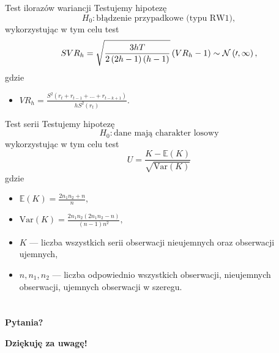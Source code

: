 \documentclass[a4paper, 11pt]{beamer}
\begin{document}
	\begin{frame}{Test ilorazów wariancji}
		Testujemy hipotezę \[
				H_{0}: \mbox{błądzenie przypadkowe (typu RW1)},
		\] wykorzystując w tym celu test \[
			SVR_h = \sqrt{\frac{3hT}{2\left(2h-1\right)\left(h-1\right)}} \left(VR_h - 1\right) \sim \cal{N}\left(0,1\right),
		\] gdzie
		\begin{itemize}
			\item $VR_h = \frac{S^2\left(r_t+r_{t-1}+\ldots+r_{t-k+1}\right)}{hS^2\left(r_t\right)}.$
		\end{itemize}
	\end{frame}
	
	\begin{frame}{Test serii}
		Testujemy hipotezę \[
				H_{0}: \mbox{dane mają charakter losowy}
		\] wykorzystując w tym celu test \[
			U=\frac{K-\mathbb{E}\left(K\right)}{\sqrt{\mbox{Var}\left(K\right)}}
		\] gdzie
		\begin{itemize}
			\item $\mathbb{E}\left(K\right) = \frac{2 n_1 n_2 + n}{n},$
			\item $\mbox{Var}\left(K\right) = \frac{2 n_1 n_2 \left(2 n_1 n_2 - n\right)}{\left(n - 1\right) n^2},$
			\item $K$ --- liczba wszystkich serii obserwacji nieujemnych oraz obserwacji ujemnych,
			\item $n, n_1, n_2$ --- liczba odpowiednio wszystkich obserwacji, nieujemnych obserwacji, ujemnych obserwacji w szeregu.
		\end{itemize}
	\end{frame}
	
	\section*{}
	
	\begin{frame}
		\center
		\Huge \bfseries
		Pytania?
	\end{frame}

	\begin{frame}
		\center
		\Huge \bfseries
		Dziękuję za uwagę!
	\end{frame}
\end{document}
